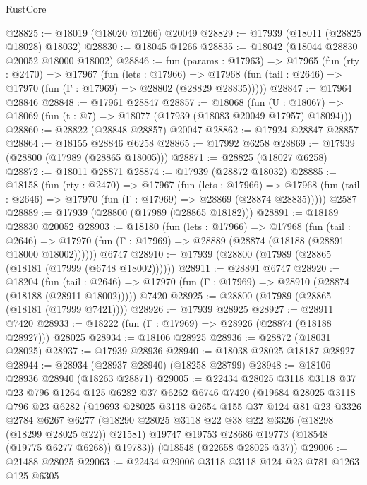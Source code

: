 \begin{lexlean}{RustCore}
\begin{coremodule}
@28825 := @18019 (@18020 @1266) @20049
@28829 := @17939 (@18011 (@28825 @18028) @18032)
@28830 := @18045 @1266
@28835 := @18042 (@18044 @28830 @20052 @18000 @18002)
@28846 := fun (params : @17963) =>
  @17965
    (fun (rty : @2470) =>
    @17967
      (fun (lets : @17966) =>
      @17968 (fun (tail : @2646) => @17970 (fun (Γ : @17969) => @28802 (@28829 @28835)))))
@28847 := @17964 @28846
@28848 := @17961 @28847
@28857 := @18068
    (fun (U : @18067) => @18069 (fun (t : @7) => @18077 (@17939 (@18083 @20049 @17957) @18094)))
@28860 := @28822 (@28848 @28857) @20047
@28862 := @17924 @28847 @28857
@28864 := @18155 @28846 @6258
@28865 := @17992 @6258
@28869 := @17939 (@28800 (@17989 (@28865 @18005)))
@28871 := @28825 (@18027 @6258)
@28872 := @18011 @28871
@28874 := @17939 (@28872 @18032)
@28885 := @18158
    (fun (rty : @2470) =>
    @17967
      (fun (lets : @17966) =>
      @17968 (fun (tail : @2646) => @17970 (fun (Γ : @17969) => @28869 (@28874 @28835)))))
    @2587
@28889 := @17939 (@28800 (@17989 (@28865 @18182)))
@28891 := @18189 @28830 @20052
@28903 := @18180
    (fun (lets : @17966) =>
    @17968
      (fun (tail : @2646) =>
      @17970 (fun (Γ : @17969) => @28889 (@28874 (@18188 (@28891 @18000 @18002))))))
    @6747
@28910 := @17939 (@28800 (@17989 (@28865 (@18181 (@17999 (@6748 @18002))))))
@28911 := @28891 @6747
@28920 := @18204
    (fun (tail : @2646) => @17970 (fun (Γ : @17969) => @28910 (@28874 (@18188 (@28911 @18002)))))
    @7420
@28925 := @28800 (@17989 (@28865 (@18181 (@17999 @7421))))
@28926 := @17939 @28925
@28927 := @28911 @7420
@28933 := @18222 (fun (Γ : @17969) => @28926 (@28874 (@18188 @28927))) @28025
@28934 := @18106 @28925
@28936 := @28872 (@18031 @28025)
@28937 := @17939 @28936
@28940 := @18038 @28025 @18187 @28927
@28944 := @28934 (@28937 @28940) (@18258 @28799)
@28948 := @18106 @28936 @28940 (@18263 @28871)
@29005 := @22434
    @28025
    @3118
    @3118
    @37
    @23
    @796
    @1264
    @125
    @6282
    @37
    @6262
    @6746
    @7420
    (@19684
      @28025
      @3118
      @796
      @23
      @6282
      (@19693
        @28025
        @3118
        @2654
        @155
        @37
        @124
        @81
        @23
        @3326
        @2784
        @6267
        @6277
        (@18290 @28025 @3118 @22 @38 @22 @3326 (@18298 (@18299 @28025 @22)) @21581)
        @19747
        @19753
        @28686
        @19773
        (@18548 (@19775 @6277 @6268))
        @19783))
    (@18548 (@22658 @28025 @37))
@29006 := @21488 @28025
@29063 := @22434
    @29006
    @3118
    @3118
    @124
    @23
    @781
    @1263
    @125
    @6305

\end{coremodule}
\end{lexlean}
